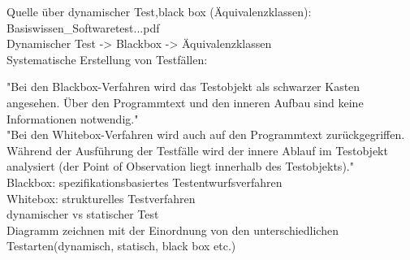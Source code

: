 Quelle über dynamischer Test,black box (Äquivalenzklassen): Basiswissen\_Softwaretest...pdf\\




Dynamischer Test -> Blackbox -> Äquivalenzklassen\\

Systematische Erstellung von Testfällen:

"Bei den Blackbox-Verfahren wird das Testobjekt als schwarzer
Kasten angesehen. Über den Programmtext und den inneren Aufbau
sind keine Informationen notwendig."\\

"Bei den Whitebox-Verfahren wird auch auf den Programmtext
zurückgegriffen. Während der Ausführung der Testfälle wird der
innere Ablauf im Testobjekt analysiert (der Point of Observation liegt
innerhalb des Testobjekts)."\\

Blackbox: spezifikationsbasiertes Testentwurfsverfahren\\

Whitebox: strukturelles Testverfahren\\

dynamischer vs statischer Test\\

Diagramm zeichnen mit der Einordnung von den unterschiedlichen Testarten(dynamisch, statisch, black box etc.)





